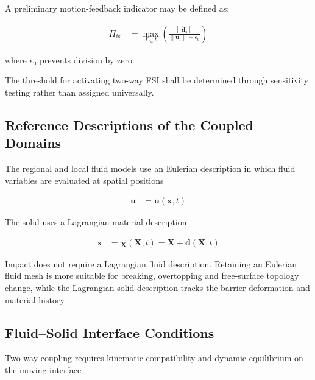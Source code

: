 A preliminary motion-feedback indicator may be defined as:

\begin{align}
  \Pi_{\mathrm{fsi}}
  &=
  \max_{\Gamma_{\mathrm{fs}},t}
  \left(
    \frac{
      \left\lVert
      \dot{\mathbf{d}}_{\mathrm{s}}
      \right\rVert
    }{
      \left\lVert
      \mathbf{u}_{\mathrm{f}}
      \right\rVert
      +
      \epsilon_{\mathrm{u}}
    }
  \right)
  \label{eq:res-str-fsi-motion-feedback-indicator}
\end{align}

where $\epsilon_{\mathrm{u}}$ prevents division by zero.

The threshold for activating two-way FSI shall be determined through
sensitivity testing rather than assigned universally.

\subsection{Reference Descriptions of the Coupled Domains}
\label{subsec:res_str_fsi_reference_descriptions}

The regional and local fluid models use an Eulerian description in which fluid variables are evaluated at spatial positions

\begin{align}
\bm{u}
&=
\bm{u}\!\left(\bm{x},t\right)
\label{eq:res_str_fsi_eulerian_velocity}
\end{align}

The solid uses a Lagrangian material description

\begin{align}
\bm{x}
&=
\bm{\chi}\!\left(\bm{X},t\right)
=
\bm{X}
+
\bm{d}\!\left(\bm{X},t\right)
\label{eq:res_str_fsi_lagrangian_motion}
\end{align}

Impact does not require a Lagrangian fluid description. Retaining an Eulerian fluid mesh is more suitable for breaking, overtopping and free-surface topology change, while the Lagrangian solid description tracks the barrier deformation and material history.

\subsection{Fluid--Solid Interface Conditions}
\label{subsec:res_str_fsi_interface_conditions}

Two-way coupling requires kinematic compatibility and dynamic equilibrium on the moving interface

